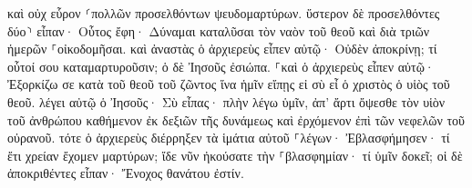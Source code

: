 \documentclass{openreader}
\begin{document}
καὶ οὐχ εὗρον ⸂πολλῶν προσελθόντων ψευδομαρτύρων. ὕστερον δὲ προσελθόντες δύο⸃ 
εἶπαν· Οὗτος ἔφη· Δύναμαι καταλῦσαι τὸν ναὸν τοῦ θεοῦ καὶ διὰ τριῶν ἡμερῶν ⸀οἰκοδομῆσαι. 
καὶ ἀναστὰς ὁ ἀρχιερεὺς εἶπεν αὐτῷ· Οὐδὲν ἀποκρίνῃ; τί οὗτοί σου καταμαρτυροῦσιν; 
ὁ δὲ Ἰησοῦς ἐσιώπα. ⸀καὶ ὁ ἀρχιερεὺς εἶπεν αὐτῷ· Ἐξορκίζω σε κατὰ τοῦ θεοῦ τοῦ ζῶντος ἵνα ἡμῖν εἴπῃς εἰ σὺ εἶ ὁ χριστὸς ὁ υἱὸς τοῦ θεοῦ. 
λέγει αὐτῷ ὁ Ἰησοῦς· Σὺ εἶπας· πλὴν λέγω ὑμῖν, ἀπ’ ἄρτι ὄψεσθε τὸν υἱὸν τοῦ ἀνθρώπου καθήμενον ἐκ δεξιῶν τῆς δυνάμεως καὶ ἐρχόμενον ἐπὶ τῶν νεφελῶν τοῦ οὐρανοῦ. 
τότε ὁ ἀρχιερεὺς διέρρηξεν τὰ ἱμάτια αὐτοῦ ⸀λέγων· Ἐβλασφήμησεν· τί ἔτι χρείαν ἔχομεν μαρτύρων; ἴδε νῦν ἠκούσατε τὴν ⸀βλασφημίαν· 
τί ὑμῖν δοκεῖ; οἱ δὲ ἀποκριθέντες εἶπαν· Ἔνοχος θανάτου ἐστίν. 
\end{document}
